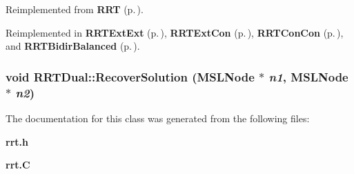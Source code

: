 Reimplemented from {\bf RRT} {\rm (p.\,\pageref{classRRT_a3})}.

Reimplemented in {\bf RRTExt\-Ext} {\rm (p.\,\pageref{classRRTExtExt_a2})}, {\bf RRTExt\-Con} {\rm (p.\,\pageref{classRRTExtCon_a2})}, {\bf RRTCon\-Con} {\rm (p.\,\pageref{classRRTConCon_a2})}, and {\bf RRTBidir\-Balanced} {\rm (p.\,\pageref{classRRTBidirBalanced_a2})}.
\subsubsection{\setlength{\rightskip}{0pt plus 5cm}void RRTDual::Recover\-Solution ({\bf MSLNode} $\ast$ {\em n1}, {\bf MSLNode} $\ast$ {\em n2})\hspace{0.3cm}{\tt  [protected]}}\label{classRRTDual_b0}




The documentation for this class was generated from the following files:\begin{CompactItemize}
\item 
{\bf rrt.h}\item 
{\bf rrt.C}\end{CompactItemize}

